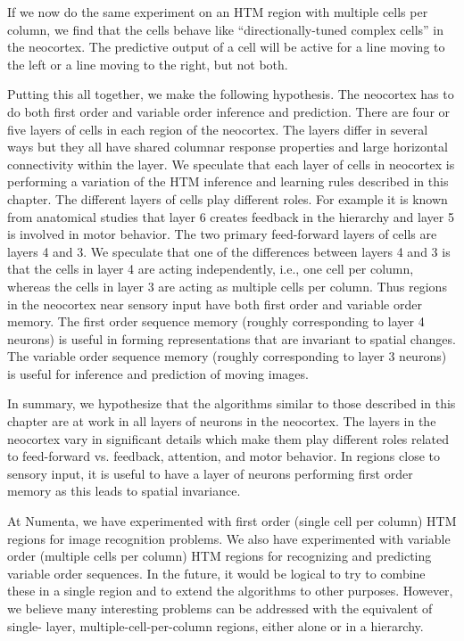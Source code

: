\documentclass{report}
\begin{document}
If we now do the same experiment on an HTM region with multiple cells
per column, we find that the cells behave like ``directionally-tuned
complex cells'' in the neocortex. The predictive output of a cell will
be active for a line moving to the left or a line moving to the right,
but not both.

Putting this all together, we make the following hypothesis. The
neocortex has to do both first order and variable order inference and
prediction. There are four or five layers of cells in each region of
the neocortex. The layers differ in several ways but they all have
shared columnar response properties and large horizontal connectivity
within the layer. We speculate that each layer of cells in neocortex
is performing a variation of the HTM inference and learning rules
described in this chapter. The different layers of cells play
different roles. For example it is known from anatomical studies that
layer 6 creates feedback in the hierarchy and layer 5 is involved in
motor behavior. The two primary feed-forward layers of cells are
layers 4 and 3. We speculate that one of the differences between
layers 4 and 3 is that the cells in layer 4 are acting independently,
i.e., one cell per column, whereas the cells in layer 3 are acting as
multiple cells per column. Thus regions in the neocortex near sensory
input have both first order and variable order memory. The first order
sequence memory (roughly corresponding to layer 4 neurons) is useful
in forming representations that are invariant to spatial changes. The
variable order sequence memory (roughly corresponding to layer 3
neurons) is useful for inference and prediction of moving images.

In summary, we hypothesize that the algorithms similar to those
described in this chapter are at work in all layers of neurons in the
neocortex. The layers in the neocortex vary in significant details
which make them play different roles related to feed-forward
vs. feedback, attention, and motor behavior. In regions close to
sensory input, it is useful to have a layer of neurons performing
first order memory as this leads to spatial invariance.

At Numenta, we have experimented with first order (single cell per
column) HTM regions for image recognition problems. We also have
experimented with variable order (multiple cells per column) HTM
regions for recognizing and predicting variable order sequences. In
the future, it would be logical to try to combine these in a single
region and to extend the algorithms to other purposes. However, we
believe many interesting problems can be addressed with the equivalent
of single- layer, multiple-cell-per-column regions, either alone or in
a hierarchy.
\end{document}
